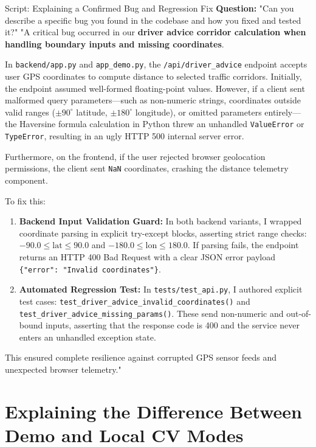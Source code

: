 \documentclass[11pt,a4paper,oneside]{report}
\begin{document}
\begin{interviewq}{Script: Explaining a Confirmed Bug and Regression Fix}
\textbf{Question:} "Can you describe a specific bug you found in the codebase and how you fixed and tested it?"
\tcblower
"A critical bug occurred in our \textbf{driver advice corridor calculation when handling boundary inputs and missing coordinates}.

In \texttt{backend/app.py} and \texttt{app\_demo.py}, the \texttt{/api/driver\_advice} endpoint accepts user GPS coordinates to compute distance to selected traffic corridors. Initially, the endpoint assumed well-formed floating-point values. However, if a client sent malformed query parameters---such as non-numeric strings, coordinates outside valid ranges ($\pm 90^\circ$ latitude, $\pm 180^\circ$ longitude), or omitted parameters entirely---the Haversine formula calculation in Python threw an unhandled \texttt{ValueError} or \texttt{TypeError}, resulting in an ugly HTTP 500 internal server error.

Furthermore, on the frontend, if the user rejected browser geolocation permissions, the client sent \texttt{NaN} coordinates, crashing the distance telemetry component.

To fix this:
\begin{enumerate}
    \item \textbf{Backend Input Validation Guard:} In both backend variants, I wrapped coordinate parsing in explicit try-except blocks, asserting strict range checks: $-90.0 \le \text{lat} \le 90.0$ and $-180.0 \le \text{lon} \le 180.0$. If parsing fails, the endpoint returns an HTTP 400 Bad Request with a clear JSON error payload \texttt{\{"error": "Invalid coordinates"\}}.
    \item \textbf{Automated Regression Test:} In \texttt{tests/test\_api.py}, I authored explicit test cases: \texttt{test\_driver\_advice\_invalid\_coordinates()} and \texttt{test\_driver\_advice\_missing\_params()}. These send non-numeric and out-of-bound inputs, asserting that the response code is 400 and the service never enters an unhandled exception state.
\end{enumerate}
This ensured complete resilience against corrupted GPS sensor feeds and unexpected browser telemetry."
\end{interviewq}

\section{Explaining the Difference Between Demo and Local CV Modes}
\label{sec:script_modes_diff}
\end{document}
